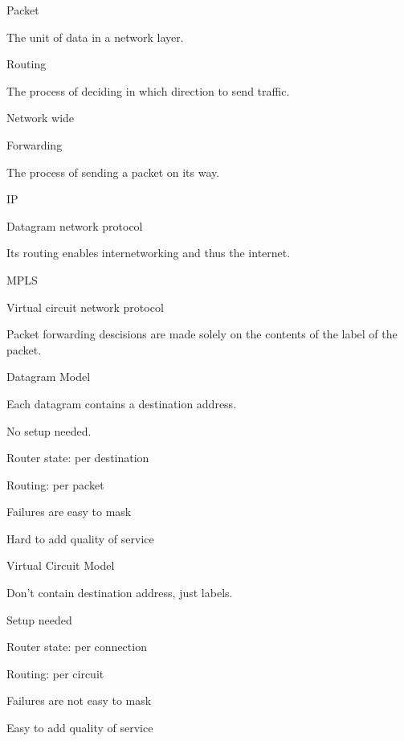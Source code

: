 \documentclass[main.tex]{subfiles}
\begin{document}
\small


\begin{card}{Packet}
\item The unit of data in a network layer.
\end{card}

\begin{card}{Routing}
\item The process of deciding in which direction to send traffic.
\item Network wide
\end{card}

\begin{card}{Forwarding}
\item The process of sending a packet on its way.
\end{card}

\begin{card}{IP}
\item Datagram network protocol
\item Its routing enables internetworking and thus the internet.
\end{card}

\begin{card}{MPLS}
\item Virtual circuit network protocol
\item Packet forwarding descisions are made solely on the contents of the label of the packet.
\end{card}

\begin{card}{Datagram Model}
\item Each datagram contains a destination address.
\item No setup needed.
\item Router state: per destination
\item Routing: per packet
\item Failures are easy to mask
\item Hard to add quality of service
\end{card}

\begin{card}{Virtual Circuit Model}
\item Don't contain destination address, just labels.
\item Setup needed
\item Router state: per connection
\item Routing: per circuit
\item Failures are not easy to mask
\item Easy to add quality of service
\end{card}
\end{document}
